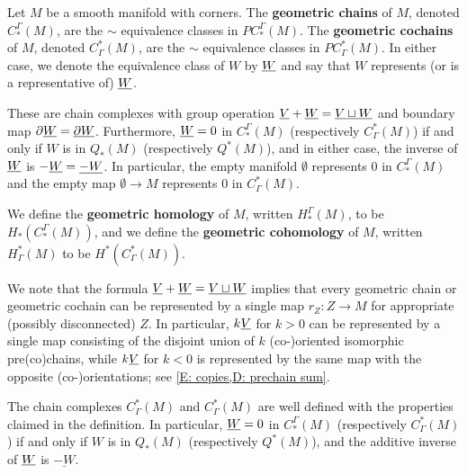 \begin{definition}\label{D: chains and cochains}
	Let $M$ be a smooth manifold with corners.
	The \textbf{geometric chains} of $M$, denoted $C^\Gamma_*(M)$, are the $\sim$ equivalence classes in $PC^\Gamma_*(M)$.
	The \textbf{geometric cochains} of $M$, denoted $C_\Gamma^*(M)$, are the $\sim$ equivalence classes in $PC_\Gamma^*(M)$.
	In either case, we denote the equivalence class of $W$ by $\underline{W}$ and say that $W$ represents (or is a representative of) $\underline{W}$.

	These are chain complexes with group operation $\underline{V} + \underline{W} = \underline{V \sqcup W}$ and boundary map $\partial \underline{W} = \underline{\partial W}$.
	Furthermore, $\underline{W} = 0$ in $C^\Gamma_*(M)$ (respectively $C_\Gamma^*(M)$) if and only if $W$ is in $Q_*(M)$ (respectively $Q^*(M)$), and in either case, the inverse of $\underline{W}$ is $-\underline{W} = \underline{-W}$.
	In particular, the empty manifold $\emptyset$ represents $0$ in $C^\Gamma_*(M)$ and the empty map $\emptyset \to M$ represents $0$ in $C^*_\Gamma(M)$.

	We define the \textbf{geometric homology} of $M$, written $H_*^\Gamma(M)$, to be $H_*(C^\Gamma_*(M))$, and
	we define the \textbf{geometric cohomology} of $M$, written $H^*_\Gamma(M)$ to be $H^*(C_\Gamma^*(M))$.
\end{definition}

We note that the formula $\underline{V} + \underline{W} = \underline{V \sqcup W}$ implies that every geometric chain or geometric cochain can be represented by a single map $r_Z \colon Z \to M$ for appropriate (possibly disconnected) $Z$.
In particular, $k \underline{V}$ for $k>0$ can be represented by a single map consisting of the disjoint union of $k$ (co-)oriented isomorphic pre(co)chains, while $k \underline{V}$ for $k<0$ is represented by the same map with the opposite (co-)orientations; see \cref{E: copies,D: prechain sum}.


\begin{lemma}\label{L: co/chains well defined}
	The chain complexes $C_\Gamma^*(M)$ and $C_\Gamma^*(M)$ are well defined with the properties claimed in the definition.
	In particular, $\underline{W} = 0$ in $C^\Gamma_*(M)$ (respectively $C_\Gamma^*(M)$) if and only if $W$ is in $Q_*(M)$ (respectively $Q^*(M)$), and the additive inverse of $\underline{W}$ is $\underline{-W}$.
\end{lemma}

